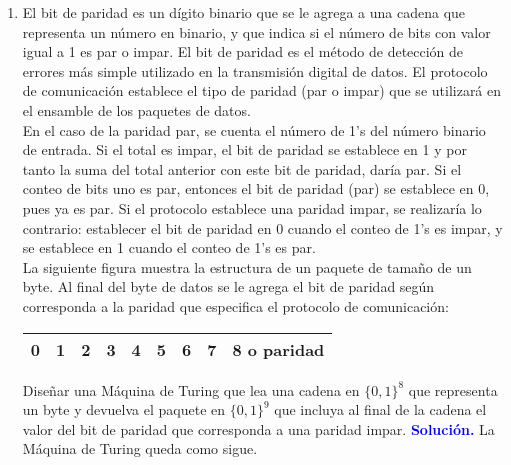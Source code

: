 \documentclass[11pt]{article}
\newcommand{\solution}{\textcolor{blue}{\textbf{Solución. }}}
\begin{document}
\begin{enumerate}
    \item El bit de paridad es un dígito binario que se le agrega a una cadena que representa un número en binario, y que indica si el número de bits con valor igual a 1 es par o impar. El bit de paridad es el método de detección de errores más simple utilizado en la transmisión digital de datos. El protocolo de comunicación establece el tipo de paridad (par o impar) que se utilizará en el ensamble de los paquetes de datos. \vspace{3mm} \\ 
    En el caso de la paridad par, se cuenta el número de 1's del número binario de entrada. Si el total es impar, el bit de paridad se establece en 1 y por tanto la suma del total anterior con este bit de paridad, daría par. Si el conteo de bits uno es par, entonces el bit de paridad (par) se establece en 0, pues ya es par. Si el protocolo establece una paridad impar, se realizaría lo contrario: establecer el bit de paridad en 0 cuando el conteo de 1's es impar, y se establece en 1 cuando el conteo de 1's es par. \vspace{3mm} \\ 
    La siguiente figura muestra la estructura de un paquete de tamaño de un byte. Al final del byte de datos se le agrega el bit de paridad según corresponda a la paridad que especifica el protocolo de comunicación:
    \begin{center}
        \begin{tabular}{|c|c|c|c|c|c|c|c|c|}
            \hline
            0 & 1 & 2 & 3 & 4 & 5 & 6 & 7 & 8 o paridad \\
            \hline
        \end{tabular}
    \end{center}
    Diseñar una Máquina de Turing que lea una cadena en $\{ 0,1 \}^8$ que representa un byte y devuelva el paquete en $\{ 0,1 \}^9$ que incluya al final de la cadena el valor del bit de paridad que corresponda a una paridad impar. \newpage 
    \solution La Máquina de Turing queda como sigue.
	\begin{center} {\small
         }
    \end{center}
    

\end{enumerate}
\end{document}
